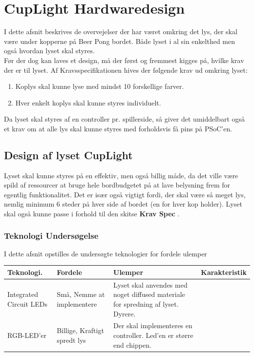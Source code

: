 \documentclass[HardwareDesign/HardwareDesign_main.tex]{subfiles}
\begin{document}
\section{CupLight Hardwaredesign}\label{sec:cuplight_hw_design}
I dette afsnit beskrives de overvejelser der har været omkring det lys, der skal være under kopperne på Beer Pong bordet. Både lyset i al sin enkelthed men også hvordan lyset skal styres.\\

Før der dog kan laves et design, må der først og fremmest kigges på, hvilke krav der er til lyset. Af Kravsspecifikationen  hives der følgende krav ud omkring lyset:
\begin{enumerate}
    \item Koplys skal kunne lyse med mindst 10 forskellige farver.
    \item Hver enkelt koplys skal kunne styres individuelt.
\end{enumerate}
Da lyset skal styres af en controller pr. spillerside, så giver det umiddelbart også et krav om at alle lys skal kunne styres med forholdsvis få pins på PSoC'en. 
\subsection{Design af lyset CupLight}
Lyset skal kunne styres på en effektiv, men også billig måde, da det ville være spild af ressourcer at bruge hele bordbudgetet på at lave belysning frem for egentlig funktionalitet. Det er især også vigtigt fordi, der skal være så meget lys, nemlig minimum 6 steder på hver side af bordet (en for hver kop holder). Lyset skal også kunne passe i forhold til den skitse \textbf{Krav Spec} .
\subsubsection{Teknologi Undersøgelse}
I dette afsnit opstilles de undersøgte teknologier for fordele ulemper
\begin{longtable}[H]{|L{0.2\textwidth}|L{0.2\textwidth}|L{0.2\textwidth}|L{0.2\textwidth}|}
        \hline
        \textbf{Teknologi.} & \textbf{Fordele} & \textbf{Ulemper} & \textbf{Karakteristik} \\ \hline
        Integrated Circuit LEDs & Små, Nemme at implementere & Lyset skal anvendes med noget diffused materiale for spredning af lyset. Dyrere.\\ \hline
        RGB-LED'er & Billige, Kraftigt spredt lys  & Der skal implementeres en controller. Led'en er større end chippen.\\ \hline
\end{longtable}
\end{document}
